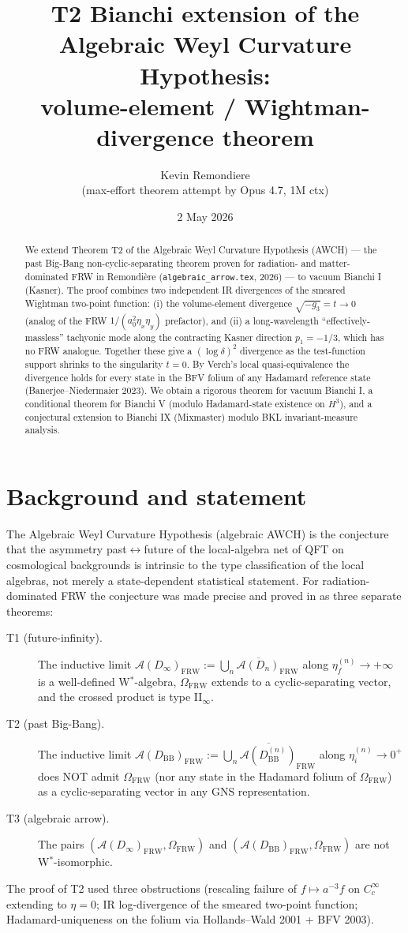 \documentclass[11pt,a4paper]{article}
\title{T2 Bianchi extension of the Algebraic Weyl Curvature Hypothesis:\\
  volume-element / Wightman-divergence theorem}
\author{Kevin Remondiere\\\small (max-effort theorem attempt by Opus 4.7, 1M ctx)}
\date{2 May 2026}
\theoremstyle{definition}
\newcommand{\AA}{\mathcal{A}}
\newcommand{\FRW}{\mathrm{FRW}}
\newcommand{\BB}{\mathrm{BB}}
\begin{document}
\maketitle

\begin{abstract}
We extend Theorem T2 of the Algebraic Weyl Curvature Hypothesis (AWCH) ---
the past Big-Bang non-cyclic-separating theorem proven for radiation- and
matter-dominated FRW in Remondi\`ere (\texttt{algebraic\_arrow.tex}, 2026) ---
to vacuum Bianchi I (Kasner). The proof combines two independent IR
divergences of the smeared Wightman two-point function: (i) the
volume-element divergence $\sqrt{-g_3}=t \to 0$ (analog of the FRW
$1/(a_0^2\eta_x\eta_y)$ prefactor), and (ii) a long-wavelength
``effectively-massless'' tachyonic mode along the contracting Kasner
direction $p_1=-1/3$, which has no FRW analogue. Together these give a
$(\log\delta)^2$ divergence as the test-function support shrinks to the
singularity $t=0$. By Verch's local quasi-equivalence the divergence holds
for every state in the BFV folium of any Hadamard reference state
(Banerjee--Niedermaier 2023). We obtain a rigorous theorem for vacuum
Bianchi I, a conditional theorem for Bianchi V (modulo Hadamard-state
existence on $H^3$), and a conjectural extension to Bianchi IX
(Mixmaster) modulo BKL invariant-measure analysis.
\end{abstract}

\section{Background and statement}

The Algebraic Weyl Curvature Hypothesis (algebraic AWCH) is the conjecture
that the asymmetry past$\leftrightarrow$future of the local-algebra net of
QFT on cosmological backgrounds is intrinsic to the type classification of
the local algebras, not merely a state-dependent statistical statement.
For radiation-dominated FRW the conjecture was made precise and proved in
\cite{Remondiere2026FRW} as three separate theorems:
\begin{description}
  \item[T1 (future-infinity).] The inductive limit
  $\AA(D_\infty)_\FRW := \overline{\bigcup_n \AA(D_n)_\FRW}$ along
  $\eta_f^{(n)}\to+\infty$ is a well-defined W$^*$-algebra, $\Omega_\FRW$
  extends to a cyclic-separating vector, and the crossed product is
  type II$_\infty$.
  \item[T2 (past Big-Bang).] The inductive limit
  $\AA(D_\BB)_\FRW := \overline{\bigcup_n \AA(D_\BB^{(n)})_\FRW}$ along
  $\eta_i^{(n)}\to0^+$ does NOT admit $\Omega_\FRW$ (nor any state in the
  Hadamard folium of $\Omega_\FRW$) as a cyclic-separating vector in
  any GNS representation.
  \item[T3 (algebraic arrow).] The pairs $(\AA(D_\infty)_\FRW,\Omega_\FRW)$
  and $(\AA(D_\BB)_\FRW,\Omega_\FRW)$ are not W$^*$-isomorphic.
\end{description}
The proof of T2 used three obstructions (rescaling failure of $f\mapsto a^{-3}f$
on $C_c^\infty$ extending to $\eta=0$; IR log-divergence of the smeared
two-point function; Hadamard-uniqueness on the folium via Hollands--Wald
2001 + BFV 2003).
\end{document}

